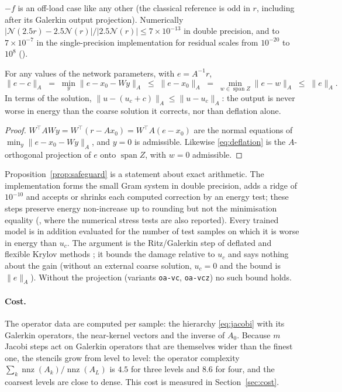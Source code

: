 $-f$ is an off-load case like any other (the classical reference is odd in $r$, including after its Galerkin output projection). Numerically $|\mathcal{N}(2.5r)-2.5\mathcal{N}(r)|/|2.5\mathcal{N}(r)|\le 7\times10^{-13}$ in
double precision, and to $7\times10^{-7}$ in the single-precision implementation for residual scales from $10^{-20}$ to $10^{8}$
().
\begin{proposition}\label{prop:safeguard}
For any values of the network parameters, with $e = A^{-1}r$,
\[
  \|e - c\|_A \;=\; \min_{y}\|e - x_0 - Wy\|_A \;\le\; \|e - x_0\|_A \;=\; \min_{w\in\operatorname{span}Z}\|e - w\|_A \;\le\; \|e\|_A .
\]
In terms of the solution, $\|u - (u_c + c)\|_A \le \|u - u_c\|_A$: the output is never worse in energy than the coarse
solution it corrects, nor than deflation alone.
\end{proposition}
\begin{proof}
$W^\top A W y = W^\top(r - Ax_0) = W^\top A(e - x_0)$ are the normal equations of $\min_y\|e - x_0 - Wy\|_A$, and $y = 0$
is admissible. Likewise \eqref{eq:deflation} is the $A$-orthogonal projection of $e$ onto $\operatorname{span}Z$, with
$w = 0$ admissible.
\end{proof}
Proposition~\ref{prop:safeguard} is a statement about exact arithmetic. The implementation forms the small Gram system in
double precision, adds a ridge of $10^{-10}$ and accepts or shrinks each computed correction by an energy test; these steps
preserve energy non-increase up to rounding but not the minimisation equality (, where the numerical stress
tests are also reported). Every trained model is in addition evaluated for the number of test samples on which it is worse
in energy than $u_c$. The argument is the Ritz/Galerkin step of deflated and flexible Krylov methods \cite{frank2001,rudikov2024};
it bounds the damage relative to $u_c$ and says nothing about the gain (without an external coarse solution, $u_c = 0$ and the
bound is $\|e\|_A$). Without the projection (variants \texttt{oa-vc}, \texttt{oa-vcz}) no such bound holds.

\paragraph{Cost.} The operator data are computed per sample: the hierarchy \eqref{eq:jacobi} with its Galerkin
operators, the near-kernel vectors and the inverse of $A_0$. Because $m$ Jacobi steps act on Galerkin operators that are
themselves wider than the finest one, the stencils grow from level to level: the operator complexity
$\sum_k\operatorname{nnz}(A_k)/\operatorname{nnz}(A_L)$ is $4.5$ for three levels and $8.6$ for four, and the coarsest
levels are close to dense. This cost is measured in Section~\ref{sec:cost}.

